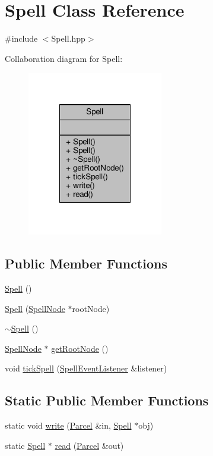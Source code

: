 \hypertarget{class_spell}{\section{Spell Class Reference}
\label{class_spell}
}


{\ttfamily \#include $<$Spell.\-hpp$>$}



Collaboration diagram for Spell\-:
\nopagebreak
\begin{figure}[H]
\begin{center}
\leavevmode
\includegraphics[width=168pt]{class_spell__coll__graph}
\end{center}
\end{figure}
\subsection*{Public Member Functions}
\begin{DoxyCompactItemize}
\item 
\hyperlink{class_spell_a614361c1702859a162e1572030166cb0}{Spell} ()
\item 
\hyperlink{class_spell_a868259bb869176239ef3fb1e8f0d198c}{Spell} (\hyperlink{class_spell_node}{Spell\-Node} $\ast$root\-Node)
\item 
\hyperlink{class_spell_ab00bfde34dc5dcdc6e1035608e14c067}{$\sim$\-Spell} ()
\item 
\hyperlink{class_spell_node}{Spell\-Node} $\ast$ \hyperlink{class_spell_a8b234c2b1930d3dfc1954c6d4a30cdac}{get\-Root\-Node} ()
\item 
void \hyperlink{class_spell_a1837ad4ea2fecb2644f4818cd0a99d62}{tick\-Spell} (\hyperlink{class_spell_event_listener}{Spell\-Event\-Listener} \&listener)
\end{DoxyCompactItemize}
\subsection*{Static Public Member Functions}
\begin{DoxyCompactItemize}
\item 
static void \hyperlink{class_spell_a6b2d7baf1e88b6e8075567f8c4afb716}{write} (\hyperlink{class_parcel}{Parcel} \&in, \hyperlink{class_spell}{Spell} $\ast$obj)
\item 
static \hyperlink{class_spell}{Spell} $\ast$ \hyperlink{class_spell_aaaa7ff3183bf18d35d555f3d994fb76d}{read} (\hyperlink{class_parcel}{Parcel} \&out)
\end{DoxyCompactItemize}


